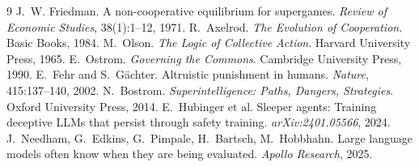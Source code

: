 \documentclass[10pt]{article}
\begin{document}
\begin{thebibliography}{9}
\small
{} J.~W. Friedman. A non-cooperative equilibrium for supergames. \emph{Review of Economic Studies}, 38(1):1--12, 1971.
 R.~Axelrod. \emph{The Evolution of Cooperation}. Basic Books, 1984.
 M.~Olson. \emph{The Logic of Collective Action}. Harvard University Press, 1965.
 E.~Ostrom. \emph{Governing the Commons}. Cambridge University Press, 1990.
 E.~Fehr and S.~G\"achter. Altruistic punishment in humans. \emph{Nature}, 415:137--140, 2002.
 N.~Bostrom. \emph{Superintelligence: Paths, Dangers, Strategies}. Oxford University Press, 2014.
 E.~Hubinger et al. Sleeper agents: Training deceptive LLMs that persist through safety training. \emph{arXiv:2401.05566}, 2024.
 J.~Needham, G.~Edkins, G.~Pimpale, H.~Bartsch, M.~Hobbhahn. Large language models often know when they are being evaluated. \emph{Apollo Research}, 2025.
\end{thebibliography}
\end{document}
